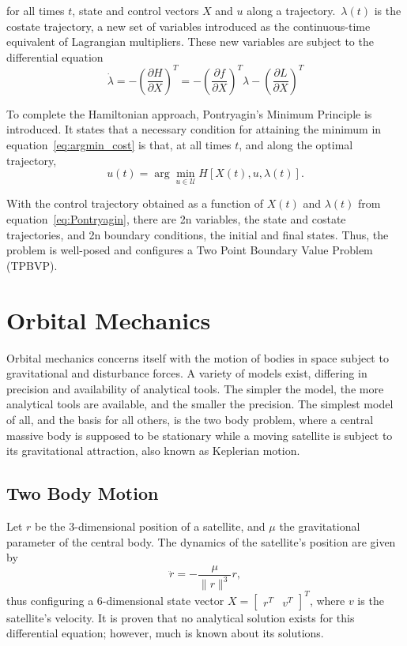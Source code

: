 for all times \(t\), state and control vectors \(X  \) and \(u\) along a trajectory.\ \( \lambda(t) \) is the costate trajectory, a new set of variables introduced as the continuous-time equivalent of Lagrangian multipliers. These new variables are subject to the differential equation
\begin{equation}
    \dot \lambda = - \left( \frac{\partial H}{\partial X} \right)^T = -\left( \frac{\partial f}{\partial X} \right)^T \lambda - \left( \frac{\partial L}{\partial X} \right)^T
\end{equation}

To complete the Hamiltonian approach, Pontryagin's Minimum Principle is introduced. It states that a necessary condition for attaining the minimum in equation~\eqref{eq:argmin_cost} is that, at all times \(t\), and along the optimal trajectory,
\begin{equation} \label{eq:Pontryagin}
    u(t) = \arg \min_{u \in \mathcal{U}} H[X(t), u, \lambda(t)].
\end{equation}

With the control trajectory obtained as a function of \(X(t)\) and \(\lambda(t)\) from equation~\eqref{eq:Pontryagin}, there are 2n variables, the state and costate trajectories, and 2n boundary conditions, the initial and final states. Thus, the problem is well-posed and configures a Two Point Boundary Value Problem (TPBVP).

\section{Orbital Mechanics}

Orbital mechanics concerns itself with the motion of bodies in space subject to gravitational and disturbance forces. A variety of models exist, differing in precision and availability of analytical tools. The simpler the model, the more analytical tools are available, and the smaller the precision. The simplest model of all, and the basis for all others, is the two body problem, where a central massive body is supposed to be stationary while a moving satellite is subject to its gravitational attraction, also known as Keplerian motion. 

\subsection{Two Body Motion}

Let \(r\) be the 3-dimensional position of a satellite, and \(\mu \) the gravitational parameter of the central body. The dynamics of the satellite's position are given by
\begin{equation}
    \ddot{r} = -\frac{\mu}{\lVert r \rVert^3} r,
\end{equation}
thus configuring a 6-dimensional state vector \(X = \begin{bmatrix}
    r^T & v^T
\end{bmatrix}^T\), where \(v\) is the satellite's velocity. It is proven that no analytical solution exists for this differential equation; however, much is known about its solutions.

